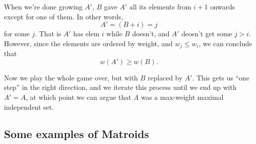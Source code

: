 \documentclass{article}
\begin{document}
When we're done growing $A'$, $B$ gave $A'$ all its elements from $i+1$ onwards
except for one of them.
In other words,
$$
A' = (B + i) = j
$$
for some $j$.
That is $A'$ has elem $i$ while $B$ doesn't, and $A'$ deosn't get some
$j>i$.
However, since the elements are ordered by weight, and $w_j \leq w_i$,
we can conclude that
$$
w(A') \geq w(B).
$$

Now we play the whole game over, but with $B$ replaced by $A'$.
This gets us ``one step'' in the right direction, and we iterate
this process until we end up with $A' = A$, at which point we can
argue that $A$ was a max-weight maximal independent set.



\subsection{Some examples of Matroids}
\end{document}
